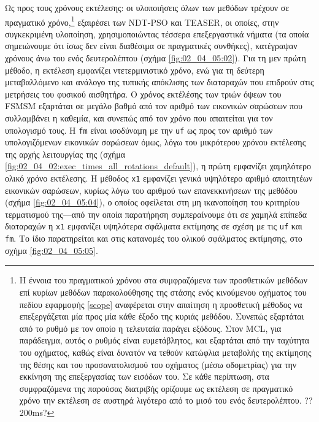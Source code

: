 Ως προς τους χρόνους εκτέλεσης: οι υλοποιήσεις όλων των μεθόδων τρέχουν σε
πραγματικό χρόνο,\footnote{Η έννοια του πραγματικού χρόνου στα συμφραζόμενα των
προσθετικών μεθόδων επί κυρίων μεθόδων παρακολούθησης της στάσης ενός
κινούμενου οχήματος του πεδίου εφαρμοφής \ref{scope} αναφέρεται στην απαίτηση η
προσθετική μέθοδος να επεξεργάζεται μία προς μία κάθε έξοδο της κυριάς μεθόδου.
Συνεπώς εξαρτάται από το ρυθμό με τον οποίο η τελευταία παράγει εξόδους.  Στον
MCL, για παράδειγμα, αυτός ο ρυθμός είναι ευμετάβλητος, και εξαρτάται από την
ταχύτητα του οχήματος, καθώς είναι δυνατόν να τεθούν κατώφλια μεταβολής της
εκτίμησης της θέσης και του προσανατολισμού του οχήματος (μέσω οδομετρίας) για
την εκκίνηση της επεξεργασίας των εισόδων του. Σε κάθε περίπτωση, στα
συμφραζόμενα της παρούσας διατριβής ορίζουμε ως εκτέλεση σε πραγματικό χρόνο
την εκτέλεση σε αυστηρά λιγότερο από το μισό του ενός δευτερολέπτου. ?? 200ms?}
εξαιρέσει των NDT-PSO και TEASER, οι οποίες, στην συγκεκριμένη υλοποίηση,
χρησιμοποιώντας τέσσερα επεξεργαστικά νήματα (τα οποία σημειώνουμε ότι ίσως δεν
είναι διαθέσιμα σε πραγματικές συνθήκες), κατέγραψαν χρόνους άνω του ενός
δευτερολέπτου (σχήμα \ref{fig:02_04_05:02}). Για τη μεν πρώτη μέθοδο, η
εκτέλεση εμφανίζει ντετερμινιστικό χρόνο, ενώ για τη δεύτερη μεταβαλλόμενο και
ανάλογο της τυπικής απόκλισης των διαταραχών που επιδρούν στις μετρήσεις του
φυσικού αισθητήρα. Ο χρόνος εκτέλέσης των τριών όψεων του FSMSM εξαρτάται σε
μεγάλο βαθμό από τον αριθμό των εικονικών σαρώσεων που συλλαμβάνει η καθεμία,
και συνεπώς από τον χρόνο που απαιτείται για τον υπολογισμό τους. Η \texttt{fm}
είναι ισοδύναμη με την \texttt{uf} ως προς τον αριθμό των υπολογιζόμενων
εικονικών σαρώσεων όμως, λόγω του μικρότερου χρόνου εκτέλεσης της αρχής
λειτουργίας της (σχήμα \ref{fig:02_04_02:exec_times_all_rotations_default}), η
πρώτη εμφανίζει χαμηλότερο ολικό χρόνο εκτέλεσης. Η μέθοδος \texttt{x1}
εμφανίζει γενικά υψηλότερο αριθμό απαιτητέων εικονικών σαρώσεων, κυρίως λόγω
του αριθμού των επανεκκινήσεων της μεθόδου (σχήμα \ref{fig:02_04_05:04}), ο
οποίος οφείλεται στη μη ικανοποίηση του κριτηρίου τερματισμού της---από την
οποία παρατήρηση συμπεραίνουμε ότι σε χαμηλά επίπεδα διαταραχών η \texttt{x1}
εμφανίζει υψηλότερα σφάλματα εκτίμησης σε σχέση με τις \texttt{uf} και
\texttt{fm}. Το ίδιο παρατηρείται και στις κατανομές του ολικού σφάλματος
εκτίμησης, στο σχήμα \ref{fig:02_04_05:05}.
